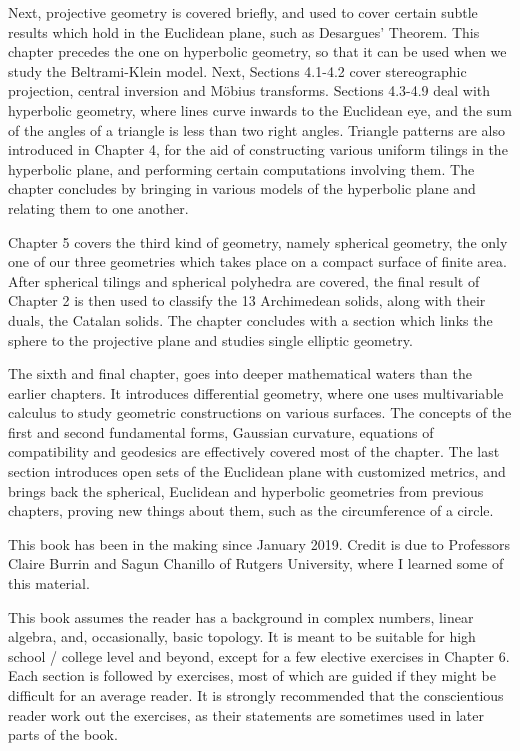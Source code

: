 \documentclass[leqno]{book}
\begin{document}
Next, projective geometry is covered briefly, and used to cover certain subtle results which hold in the Euclidean plane, such as Desargues' Theorem.  This chapter precedes the one on hyperbolic geometry, so that it can be used when we study the Beltrami-Klein model.  Next, Sections 4.1-4.2 cover stereographic projection, central inversion and M\"obius transforms.  Sections 4.3-4.9 deal with hyperbolic geometry, where lines curve inwards to the Euclidean eye, and the sum of the angles of a triangle is less than two right angles.  Triangle patterns are also introduced in Chapter 4, for the aid of constructing various uniform tilings in the hyperbolic plane, and performing certain computations involving them.  The chapter concludes by bringing in various models of the hyperbolic plane and relating them to one another.

Chapter 5 covers the third kind of geometry, namely spherical geometry, the only one of our three geometries which takes place on a compact surface of finite area.  After spherical tilings and spherical polyhedra are covered, the final result of Chapter 2 is then used to classify the 13 Archimedean solids, along with their duals, the Catalan solids.  The chapter concludes with a section which links the sphere to the projective plane and studies single elliptic geometry. %

The sixth and final chapter, goes into deeper mathematical waters than the earlier chapters.  It introduces differential geometry, where one uses multivariable calculus to study geometric constructions on various surfaces.  The concepts of the first and second fundamental forms, Gaussian curvature, equations of compatibility and geodesics are effectively covered most of the chapter.  The last section introduces open sets of the Euclidean plane with customized metrics, and brings back the spherical, Euclidean and hyperbolic geometries from previous chapters, proving new things about them, such as the circumference of a circle.

This book has been in the making since January 2019.  Credit is due to Professors Claire Burrin and Sagun Chanillo of Rutgers University, where I learned some of this material. %

This book assumes the reader has a background in complex numbers, linear algebra, and, occasionally, basic topology.  It is meant to be suitable for high school / college level and beyond, except for a few elective exercises in Chapter 6.  Each section is followed by exercises, most of which are guided if they might be difficult for an average reader.  It is strongly recommended that the conscientious reader work out the exercises, as their statements are sometimes used in later parts of the book. %
\end{document}
